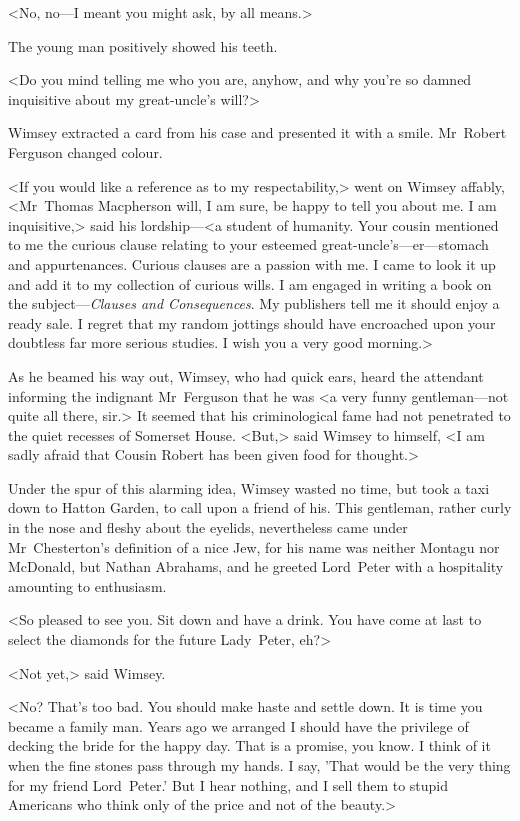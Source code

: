 <No, no—I meant you might ask, by all means.>

The young man positively showed his teeth.

<Do you mind telling me who you are, anyhow, and why you're so damned inquisitive about my great-uncle's will?>

Wimsey extracted a card from his case and presented it with a smile. Mr~Robert Ferguson changed colour.

<If you would like a reference as to my respectability,> went on Wimsey affably, <Mr~Thomas Macpherson will, I am sure, be happy to tell you about me. I am inquisitive,> said his lordship—<a student of humanity. Your cousin mentioned to me the curious clause relating to your esteemed great-uncle's—er—stomach and appurtenances. Curious clauses are a passion with me. I came to look it up and add it to my collection of curious wills. I am engaged in writing a book on the subject—\textit{Clauses and Consequences}. My publishers tell me it should enjoy a ready sale. I regret that my random jottings should have encroached upon your doubtless far more serious studies. I wish you a very good morning.>

As he beamed his way out, Wimsey, who had quick ears, heard the attendant informing the indignant Mr~Ferguson that he was <a very funny gentleman—not quite all there, sir.> It seemed that his criminological fame had not penetrated to the quiet recesses of Somerset House. <But,> said Wimsey to himself, <I am sadly afraid that Cousin Robert has been given food for thought.>

Under the spur of this alarming idea, Wimsey wasted no time, but took a taxi down to Hatton Garden, to call upon a friend of his. This gentleman, rather curly in the nose and fleshy about the eyelids, nevertheless came under Mr~Chesterton's definition of a nice Jew, for his name was neither Montagu nor McDonald, but Nathan Abrahams, and he greeted Lord~Peter with a hospitality amounting to enthusiasm.

<So pleased to see you. Sit down and have a drink. You have come at last to select the diamonds for the future Lady~Peter, eh?>

<Not yet,> said Wimsey.

<No? That's too bad. You should make haste and settle down. It is time you became a family man. Years ago we arranged I should have the privilege of decking the bride for the happy day. That is a promise, you know. I think of it when the fine stones pass through my hands. I say, 'That would be the very thing for my friend Lord~Peter.' But I hear nothing, and I sell them to stupid Americans who think only of the price and not of the beauty.>

